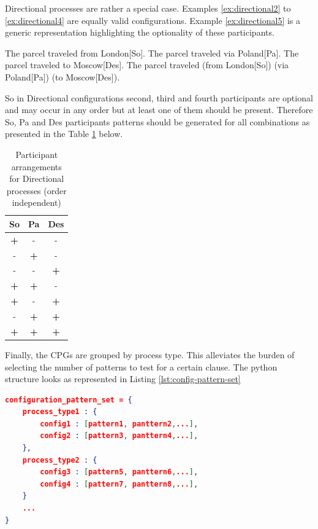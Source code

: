 Directional processes are rather a special case. Examples \ref{ex:directional2} to \ref{ex:directional4} are equally valid configurations. Example \ref{ex:directional5} is a generic representation highlighting the optionality of these participants. 
\begin{exe}
	\ex\label{ex:directional2} The parcel traveled from London[So].
	\ex\label{ex:directional3} The parcel traveled via Poland[Pa].
	\ex\label{ex:directional4} The parcel traveled to Moscow[Des].
	\ex\label{ex:directional5} The parcel traveled (from London[So]) (via Poland[Pa]) (to Moscow[Des]).
\end{exe}

So in Directional configurations second, third and fourth participants are optional and may occur in any order but at least one of them should be present. Therefore So, Pa and Des participants patterns should be generated for all combinations as presented in the Table \ref{tab:directional-partic-variations} below.

\begin{table}[H]
	\centering
	\begin{tabular}{|c|c|c|}
		\hline
		\textbf{So} & \textbf{Pa} & \textbf{Des} \\ \hline
		\textbf{+} & - & - \\ \hline
		- & \textbf{+} & - \\ \hline
		- & - & \textbf{+} \\ \hline
		\textbf{+} & \textbf{+} & - \\ \hline
		\textbf{+} & - & \textbf{+} \\ \hline
		- & \textbf{+} & \textbf{+} \\ \hline
		\textbf{+} & \textbf{+} & \textbf{+} \\ \hline
	\end{tabular}
	\caption{Participant arrangements for Directional processes (order independent)}
	\label{tab:directional-partic-variations}
\end{table}

Finally, the CPGs are grouped by process type. This alleviates the burden of selecting the number of patterns to test for a certain clause. The python structure looks as represented in Listing \ref{lst:config-pattern-set}

\begin{lstlisting}[language=json,firstnumber=1, caption={Configuration Pattern Set as a Python dictionary structure},label={lst:config-pattern-set}]
configuration_pattern_set = {
	process_type1 : {
		config1 : [pattern1, panttern2,...],
		config2 : [pattern3, panttern4,...],
	},
	process_type2 : {
		config3 : [pattern5, panttern6,...],
		config4 : [pattern7, panttern8,...],
	}
	...
}
\end{lstlisting}

